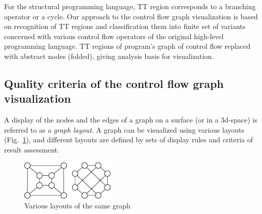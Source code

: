 \documentclass[conference]{IEEEtran}
\begin{document}
For the structural programming language, TT region corresponds to a branching operator or a cycle.  Our approach to the control flow graph visualization is based on recognition of TT regions and classification them into finite set of variants concerned with various control flow operators of the original high-level programming language.  TT regions of program's graph of control flow replaced with abstract nodes (folded), giving analysis basis for visualization.

\subsection{Quality criteria of the control flow graph visualization}
\label{sec:qcrit}

A display of the nodes and the edges of a graph on a surface (or in a 3d-space) is referred to as a \emph{graph layout}.  A graph can be visualized using various layouts (Fig.~\ref{fig:VisExample}), and different layouts are defined by sets of display rules and criteria of result assessment.

\begin{figure}[b]
	\centering
		\includegraphics[width=0.4\textwidth]{Pic/Pic1.eps}
	\caption{Various layouts of the same graph}
	\label{fig:VisExample}
\end{figure}
\end{document}
